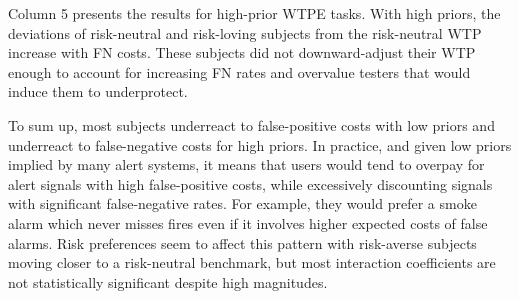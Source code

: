 \documentclass[12pt,a4paper]{article}
\newcommand{\agt}[1]{{\color{OliveGreen}#1}}
\newcommand{\aut}[1]{{\color{Red}#1}}
\begin{document}
Column 5 presents the results for high-prior WTPE tasks. With high priors, the deviations of risk-neutral and risk-loving subjects from the risk-neutral WTP increase with FN costs. These subjects did not downward-adjust their WTP enough to account for increasing FN rates and overvalue testers that would induce them to underprotect. 

To sum up, most subjects underreact to false-positive costs with low priors and underreact to false-negative costs for high priors. In practice, and given low priors implied by many alert systems, it means that users would tend to overpay for alert signals with high false-positive costs, while excessively discounting signals with significant false-negative rates. For example, they would prefer a smoke alarm which never misses fires even if it involves higher expected costs of false alarms. Risk preferences seem to affect this pattern with risk-averse subjects moving closer to a risk-neutral benchmark, but most interaction coefficients are not statistically significant despite high magnitudes.






\end{document}
